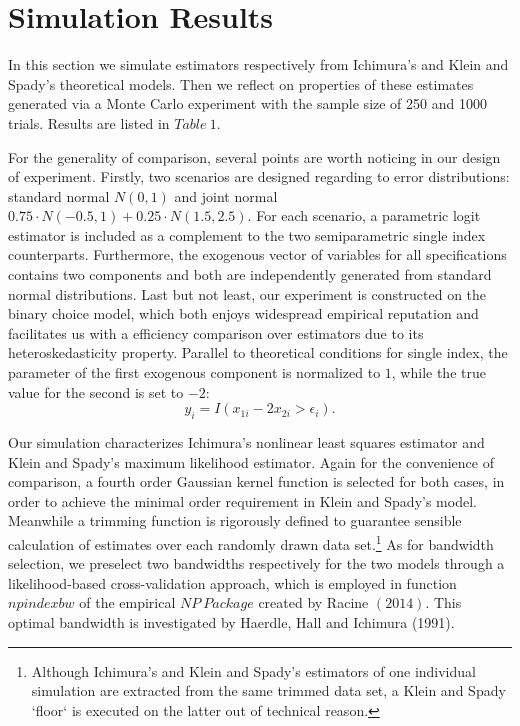 \documentclass[a4paper]{article}
\begin{document}
\section{Simulation Results}

In this section we simulate estimators respectively from Ichimura's and Klein and Spady's theoretical models. Then we reflect on properties of these estimates generated via a Monte Carlo experiment with the sample size of 250 and 1000 trials. Results are listed in $Table\ 1$.

For the generality of comparison, several points are worth noticing in our design of experiment. Firstly, two scenarios are designed regarding to error distributions: standard normal $N(0,1)$ and joint normal $0.75 \cdot N(-0.5,1)+0.25\cdot N(1.5,2.5)$. For each scenario, a parametric logit estimator is included as a complement to the two semiparametric single index counterparts. Furthermore, the exogenous vector of variables for all specifications contains two components and both are independently generated from standard normal distributions. Last but not least, our experiment is constructed on the binary choice model, which both enjoys widespread empirical reputation and facilitates us with a efficiency comparison over estimators due to its heteroskedasticity property. Parallel to theoretical conditions for single index, the parameter of the first exogenous component is normalized to $1$, while the true value for the second is set to $-2$:
\begin{equation*}
y_i = I(x_{1i} - 2x_{2i} > \epsilon_i).
\end{equation*}

Our simulation characterizes Ichimura's nonlinear least squares estimator and Klein and Spady's maximum likelihood estimator. Again for the convenience of comparison, a fourth order Gaussian kernel function is selected for both cases, in order to achieve the minimal order requirement in Klein and Spady's model. Meanwhile a trimming function is rigorously defined to guarantee sensible calculation of estimates over each randomly drawn data set.\footnote{Although Ichimura's and Klein and Spady's estimators of one individual simulation are extracted from the same trimmed data set, a Klein and Spady `floor` is executed on the latter out of technical reason.} As for bandwidth selection, we preselect two bandwidths respectively for the two models through a likelihood-based cross-validation approach, which is employed in function $npindexbw$ of the empirical $NP\ Package$ created by Racine $(2014)$. This optimal bandwidth is investigated by Haerdle, Hall and Ichimura (1991).
\end{document}
